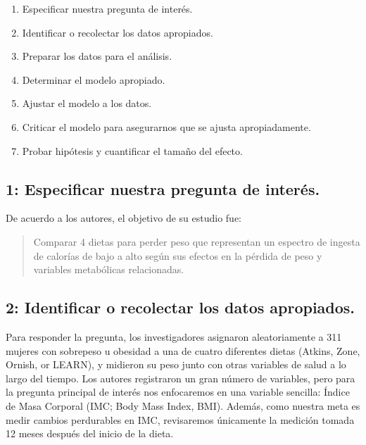 \documentclass[
  12pt,
]{book}
\providecommand{\tightlist}{%
  \setlength{\itemsep}{0pt}\setlength{\parskip}{0pt}}
\begin{document}
\begin{enumerate}
\def\labelenumi{\arabic{enumi}.}
\tightlist
\item
  Especificar nuestra pregunta de interés.
\item
  Identificar o recolectar los datos apropiados.
\item
  Preparar los datos para el análisis.
\item
  Determinar el modelo apropiado.
\item
  Ajustar el modelo a los datos.
\item
  Criticar el modelo para asegurarnos que se ajusta apropiadamente.
\item
  Probar hipótesis y cuantificar el tamaño del efecto.
\end{enumerate}

\hypertarget{especificar-nuestra-pregunta-de-interuxe9s.}{%
\subsection{1: Especificar nuestra pregunta de interés.}\label{especificar-nuestra-pregunta-de-interuxe9s.}}

De acuerdo a los autores, el objetivo de su estudio fue:

\begin{quote}
Comparar 4 dietas para perder peso que representan un espectro de ingesta de calorías de bajo a alto según sus efectos en la pérdida de peso y variables metabólicas relacionadas.
\end{quote}

\hypertarget{identificar-o-recolectar-los-datos-apropiados.}{%
\subsection{2: Identificar o recolectar los datos apropiados.}\label{identificar-o-recolectar-los-datos-apropiados.}}

Para responder la pregunta, los investigadores asignaron aleatoriamente a 311 mujeres con sobrepeso u obesidad a una de cuatro diferentes dietas (Atkins, Zone, Ornish, or LEARN), y midieron su peso junto con otras variables de salud a lo largo del tiempo. Los autores registraron un gran número de variables, pero para la pregunta principal de interés nos enfocaremos en una variable sencilla: Índice de Masa Corporal (IMC; Body Mass Index, BMI). Además, como nuestra meta es medir cambios perdurables en IMC, revisaremos únicamente la medición tomada 12 meses después del inicio de la dieta.
\end{document}
